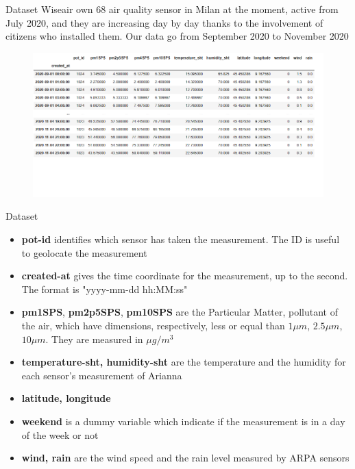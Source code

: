 \documentclass[10pt]{beamer}
\theoremstyle{remark}
\theoremstyle{definition}
\begin{document}
\begin{frame}{Dataset}
    Wiseair own 68 air quality sensor in Milan at the moment, active from July 2020, and they are increasing day by day thanks to the involvement of citizens who installed them. 
    Our data go from September 2020 to November 2020
    \begin{figure}[h]
	\centering
	\includegraphics[width=1\linewidth]{dataset.png}
\end{figure}
\end{frame}

\begin{frame}{Dataset}
\begin{itemize}
    \item < 1->  \textbf{pot-id} identifies which sensor has taken the measurement. The ID is useful to geolocate the measurement
    \item < 2 -> \textbf{created-at} gives the time coordinate for the measurement, up to the second. The format is "yyyy-mm-dd hh:MM:ss"
    \item < 3 -> \textbf{pm1SPS}, \textbf{pm2p5SPS}, \textbf{pm10SPS} are the Particular Matter, pollutant of the air, which have dimensions, respectively, less or equal than $1 \mu m$, $2.5 \mu m$, $ 10 \mu m$. 
    They are measured in $\mu g/m^{3}$
    \item < 4 -> \textbf{temperature-sht, humidity-sht} are the temperature and the humidity for each sensor's measurement of Arianna
    \item < 5 -> \textbf{latitude, longitude} 
    \item < 6 -> \textbf{weekend} is a dummy variable which indicate if the measurement is in a day of the week or not \item < 7 -> \textbf{wind, rain} are the wind speed and the rain level measured by ARPA sensors 
\end{itemize}
\end{frame}
\end{document}
